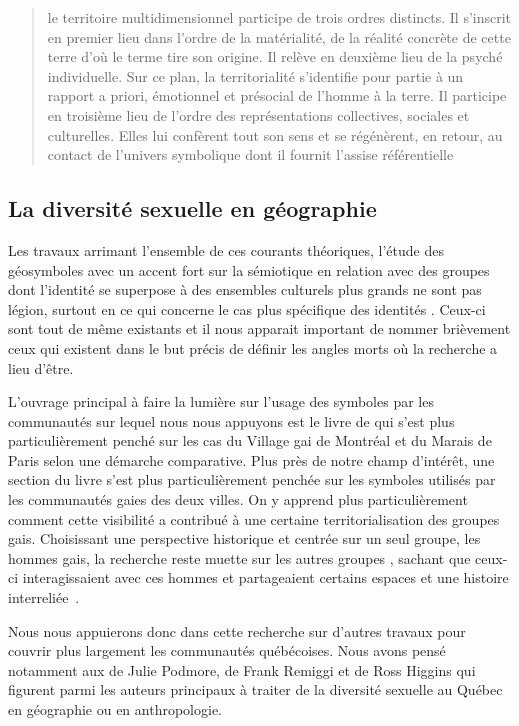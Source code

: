 \blockquote[{\cite[108]{DiMeo1998}}][.]{\textelp{} le territoire multidimensionnel participe de trois ordres distincts. Il s'inscrit en premier lieu dans l'ordre de la matérialité, de la réalité concrète de cette terre d'où le terme tire son origine. Il relève en deuxième lieu de la psyché individuelle. Sur ce plan, la territorialité s'identifie pour partie à un rapport a priori, émotionnel et présocial de l'homme à la terre. Il participe en troisième lieu de l'ordre des représentations collectives, sociales et culturelles. Elles lui confèrent tout son sens et se régénèrent, en retour, au contact de l'univers symbolique dont il fournit l'assise référentielle}.



\subsection{La diversité sexuelle en géographie}
\label{sec:la_diversit_sexuelle_en_g_ographie}  
Les travaux arrimant l'ensemble de ces courants théoriques, l'étude des géosymboles avec un accent fort sur la sémiotique en relation avec des groupes dont l'identité se superpose à des ensembles culturels plus grands ne sont pas légion, surtout en ce qui concerne le cas plus spécifique des identités \lgbt{}. 
Ceux-ci sont tout de même existants et il nous apparait important de nommer brièvement ceux qui existent dans le but précis de définir les angles morts où la recherche a lieu d'être.

L'ouvrage principal à faire la lumière sur l'usage des symboles par les communautés \lgbt{} sur lequel nous nous appuyons est le livre  de \citet{Giraud2014} qui s'est plus particulièrement penché sur les cas du Village gai de Montréal et du Marais de Paris selon une démarche comparative. 
Plus près de notre champ d'intérêt, une section du livre s'est plus particulièrement penchée sur les symboles utilisés par les communautés gaies des deux villes. 
On y apprend plus particulièrement comment cette visibilité a contribué à une certaine territorialisation des groupes gais. 
Choisissant une perspective historique et centrée sur un seul groupe, les hommes gais, la recherche reste muette sur les autres groupes \lgbt{}, sachant que ceux-ci interagissaient avec ces hommes et partageaient certains espaces et une histoire interreliée~\citep{Remiggi2000,Demczuk1998,Podmore2001,Higgins1997,Higgins1999}.

Nous nous appuierons donc dans cette recherche sur d'autres travaux pour couvrir plus largement les communautés \lgbt{} québécoises. 
Nous avons pensé notamment aux de Julie Podmore, de Frank Remiggi et de Ross Higgins qui figurent parmi les auteurs principaux à traiter de la diversité sexuelle au Québec en géographie ou en anthropologie.


